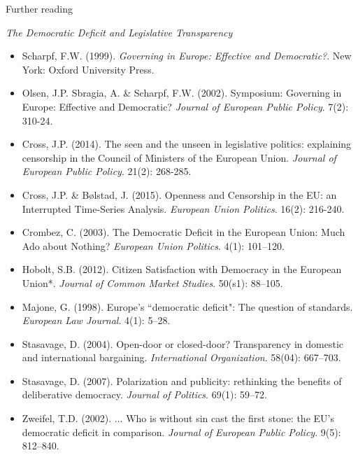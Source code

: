 \noindent Further reading

\textit{The Democratic Deficit and Legislative Transparency}

\begin{itemize}
	\item Scharpf, F.W. (1999). \textit{Governing in Europe: Effective and Democratic?}. New York: Oxford University Press.
	\item Olsen, J.P. Sbragia, A. \& Scharpf, F.W. (2002). Symposium: Governing in Europe: Effective and Democratic? \textit{Journal of European Public Policy}. 7(2): 310-24.
	\item Cross, J.P. (2014). The seen and the unseen in legislative politics: explaining censorship in the Council of Ministers of the European Union. \textit{Journal of European Public Policy}. 21(2): 268-285.
	\item Cross, J.P. \& B\o lstad, J. (2015). Openness and Censorship in the EU: an Interrupted Time-Series Analysis. \textit{European Union Politics}. 16(2): 216-240.
	\item Crombez, C. (2003). The Democratic Deficit in the European Union: Much Ado about Nothing? \textit{European Union Politics}. 4(1): 101–120.
	\item Hobolt, S.B. (2012). Citizen Satisfaction with Democracy in the European Union*. \textit{Journal of Common Market Studies}. 50(s1): 88–105.
	\item Majone, G. (1998). Europe’s ``democratic deficit": The question of standards. \textit{European Law Journal}. 4(1): 5–28.
	\item Stasavage, D. (2004). Open-door or closed-door? Transparency in domestic and international bargaining. \textit{International Organization}. 58(04): 667–703.
	\item Stasavage, D. (2007). Polarization and publicity: rethinking the benefits of deliberative democracy. \textit{Journal of Politics}. 69(1): 59–72. 
	\item Zweifel, T.D. (2002). ... Who is without sin cast the first stone: the EU's democratic deficit in comparison. \textit{Journal of European Public Policy}. 9(5): 812–840.
\end{itemize}


